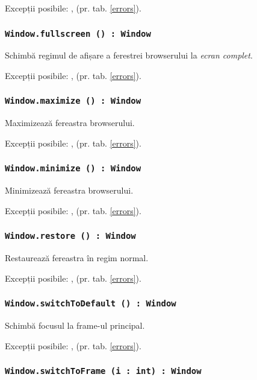 Excepții posibile: ,  (pr. tab. \ref{errors}).

\subsubsection{\texttt{Window.fullscreen () : Window}}

Schimbă regimul de afișare a ferestrei browserului la \textit{ecran complet}.

Excepții posibile: ,  (pr. tab. \ref{errors}).

\subsubsection{\texttt{Window.maximize () : Window}}

Maximizează fereastra browserului.

Excepții posibile: ,  (pr. tab. \ref{errors}).

\subsubsection{\texttt{Window.minimize () : Window}}

Minimizează fereastra browserului.

Excepții posibile: ,  (pr. tab. \ref{errors}).

\subsubsection{\texttt{Window.restore () : Window}}

Restaurează fereastra în regim normal.

Excepții posibile: ,  (pr. tab. \ref{errors}).

\subsubsection{\texttt{Window.switchToDefault () : Window}}

Schimbă focusul la frame-ul principal.

Excepții posibile: ,  (pr. tab. \ref{errors}).

\subsubsection{\texttt{Window.switchToFrame (i : int) : Window}}


